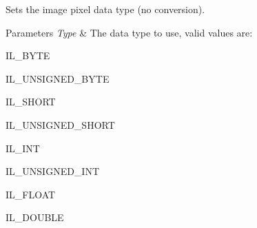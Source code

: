 Sets the image pixel data type (no conversion). 


\begin{DoxyParams}{Parameters}
{\em Type} & The data type to use, valid values are\+:
\begin{DoxyItemize}
\item I\+L\+\_\+\+B\+Y\+T\+E
\item I\+L\+\_\+\+U\+N\+S\+I\+G\+N\+E\+D\+\_\+\+B\+Y\+T\+E
\item I\+L\+\_\+\+S\+H\+O\+R\+T
\item I\+L\+\_\+\+U\+N\+S\+I\+G\+N\+E\+D\+\_\+\+S\+H\+O\+R\+T
\item I\+L\+\_\+\+I\+N\+T
\item I\+L\+\_\+\+U\+N\+S\+I\+G\+N\+E\+D\+\_\+\+I\+N\+T
\item I\+L\+\_\+\+F\+L\+O\+A\+T
\item I\+L\+\_\+\+D\+O\+U\+B\+L\+E 
\end{DoxyItemize}\\
\hline
\end{DoxyParams}
